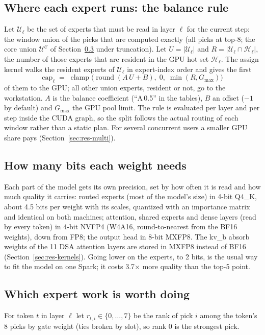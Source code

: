 \documentclass[11pt]{article}
\begin{document}
\subsection{Where each expert runs: the balance rule}
\label{sec:balance}
Let $\mathcal{U}_\ell$ be the set of experts that must be read in layer $\ell$ for the current step: the window union of
the picks that are computed exactly (all picks at top-8; the core union $\mathcal{U}^{\mathcal{C}}$ of
Section~\ref{sec:which} under truncation). Let $U = |\mathcal{U}_\ell|$ and $R = |\mathcal{U}_\ell \cap \mathcal{H}_\ell|$,
the number of those experts that are resident in the GPU hot set $\mathcal{H}_\ell$. The assign kernel walks the
resident experts of $\mathcal{U}_\ell$ in expert-index order and gives the first
\begin{equation}
  \mathrm{cap}_\ell \;=\; \operatorname{clamp}\!\Big(\operatorname{round}(A\,U + B),\; 0,\; \min(R, G_{\max})\Big)
  \label{eq:balance}
\end{equation}
of them to the GPU; all other union experts, resident or not, go to the workstation. $A$ is the balance coefficient
(``A\,0.5'' in the tables), $B$ an offset ($-1$ by default) and $G_{\max}$ the GPU pool limit. The rule is evaluated per
layer and per step inside the CUDA graph, so the split follows the actual routing of each window rather than a static
plan. For several concurrent users a smaller GPU share pays (Section~\ref{sec:res-multi}).

\subsection{How many bits each weight needs}
\label{sec:bits}
Each part of the model gets its own precision, set by how often it is read and how much quality it carries:
routed experts (most of the model's size) in 4-bit Q4\_K, about 4.5 bits per weight with its scales, quantized with an
importance matrix and identical on both machines; attention, shared experts and dense layers (read by every token) in
4-bit NVFP4 (W4A16, round-to-nearest from the BF16 weights), down from FP8; the output head in 8-bit MXFP8. The kv\_b
absorb weights of the 11 DSA attention layers are stored in MXFP8 instead of BF16 (Section~\ref{sec:res-kernels}). Going
lower on the experts, to 2 bits, is the usual way to fit the model on one Spark; it costs 3.7$\times$ more quality than
the top-5 point.

\subsection{Which expert work is worth doing}
\label{sec:which}
For token $t$ in layer $\ell$ let $r_{t,i} \in \{0,\dots,7\}$ be the rank of pick $i$ among the token's 8 picks by gate
weight (ties broken by slot), so rank 0 is the strongest pick.
\end{document}
